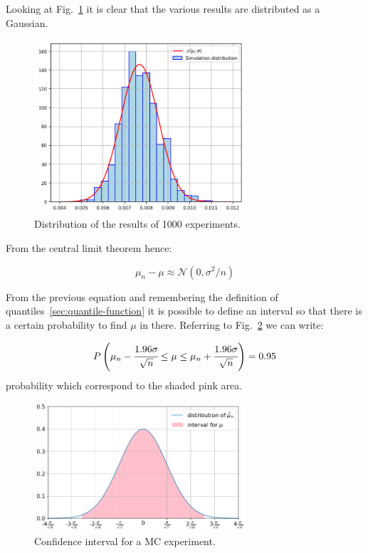 Looking at Fig.~\ref{fig:repeated_MC} it is clear that the various results are distributed as a Gaussian.

\begin{figure}[htb]
\centering
\includegraphics[width=0.7\textwidth]{figures/experiment_distribution}
\caption{Distribution of the results of 1000 experiments.}
\label{fig:repeated_MC}
\end{figure}

From the central limit theorem hence: 

\begin{equation}
\mu_n - \mu \approx \mathcal{N}(0, \sigma^2/n)
\end{equation}

From the previous equation and remembering the definition of  quantiles~\ref{sec:quantile-function} it is possible to define an interval so that there is a certain probability to find $\mu$ in there. Referring to Fig.~\ref{fig:confidence_interval} we can write:

\begin{equation}
P\left(\mu_n - \cfrac{1.96\sigma}{\sqrt{n}}\le \mu \le \mu_n + \cfrac{1.96\sigma}{\sqrt{n}}\right) = 0.95
\end{equation}
probability which correspond to the shaded pink area.

\begin{figure}[htb]
	\centering
	\includegraphics[width=0.7\textwidth]{figures/confidence_interval}
	\caption{Confidence interval for a MC experiment.}
	\label{fig:confidence_interval}
\end{figure}

